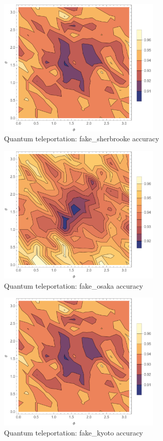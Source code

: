 \documentclass[12pt]{extarticle}
\begin{document}
\begin{figure}[H]
\centering
\includegraphics[width=0.70\textwidth]{images/homework3_q1_sherbrooke_contour.png}
\caption{Quantum teleportation: fake\_sherbrooke accuracy}
\end{figure}

\begin{figure}[H]
\centering
\includegraphics[width=0.70\textwidth]{images/homework3_q1_osaka_contour.png}
\caption{Quantum teleportation: fake\_osaka accuracy}
\end{figure}

\begin{figure}[H]
\centering
\includegraphics[width=0.70\textwidth]{images/homework3_q1_sherbrooke_contour.png}
\caption{Quantum teleportation: fake\_kyoto accuracy}
\end{figure}
\end{document}
